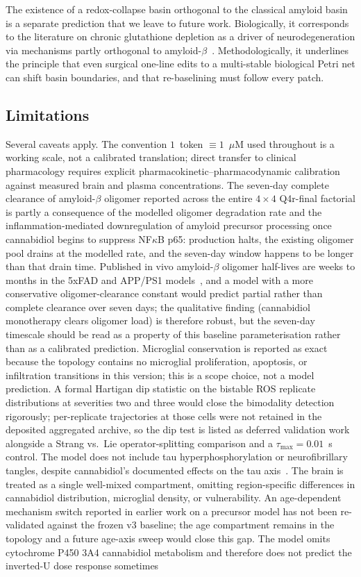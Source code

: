 \documentclass[10pt,letterpaper]{article}
\begin{document}
The existence of a redox-collapse basin orthogonal to the classical amyloid basin is a separate prediction that we leave to future work. Biologically, it corresponds to the literature on chronic glutathione depletion as a driver of neurodegeneration via mechanisms partly orthogonal to amyloid-$\beta$~\cite{cassano2020}. Methodologically, it underlines the principle that even surgical one-line edits to a multi-stable biological Petri net can shift basin boundaries, and that re-baselining must follow every patch.

\subsection{Limitations}

Several caveats apply. The convention $1$~token $\equiv 1$~$\mu$M used throughout is a working scale, not a calibrated translation; direct transfer to clinical pharmacology requires explicit pharmacokinetic--pharmacodynamic calibration against measured brain and plasma concentrations. The seven-day complete clearance of amyloid-$\beta$ oligomer reported across the entire $4 \times 4$ Q4r-final factorial is partly a consequence of the modelled oligomer degradation rate and the inflammation-mediated downregulation of amyloid precursor processing once cannabidiol begins to suppress NF$\kappa$B p65: production halts, the existing oligomer pool drains at the modelled rate, and the seven-day window happens to be longer than that drain time. Published in vivo amyloid-$\beta$ oligomer half-lives are weeks to months in the 5xFAD and APP/PS1 models~\cite{kyrtsos2015}, and a model with a more conservative oligomer-clearance constant would predict partial rather than complete clearance over seven days; the qualitative finding (cannabidiol monotherapy clears oligomer load) is therefore robust, but the seven-day timescale should be read as a property of this baseline parameterisation rather than as a calibrated prediction. Microglial conservation is reported as exact because the topology contains no microglial proliferation, apoptosis, or infiltration transitions in this version; this is a scope choice, not a model prediction. A formal Hartigan dip statistic on the bistable ROS replicate distributions at severities two and three would close the bimodality detection rigorously; per-replicate trajectories at those cells were not retained in the deposited aggregated archive, so the dip test is listed as deferred validation work alongside a Strang vs.\ Lie operator-splitting comparison and a $\tau_{\max} = 0.01$~s control. The model does not include tau hyperphosphorylation or neurofibrillary tangles, despite cannabidiol's documented effects on the tau axis~\cite{esposito2006tau}. The brain is treated as a single well-mixed compartment, omitting region-specific differences in cannabidiol distribution, microglial density, or vulnerability. An age-dependent mechanism switch reported in earlier work on a precursor model has not been re-validated against the frozen v3 baseline; the age compartment remains in the topology and a future age-axis sweep would close this gap. The model omits cytochrome P450 3A4 cannabidiol metabolism and therefore does not predict the inverted-U dose response sometimes 
\end{document}

